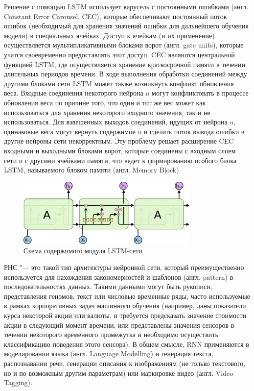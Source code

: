 \documentclass[bachelor, och, coursework]{SCWorks}
\begin{document}
        Решение с помощью LSTM использует карусель с постоянными ошибками (англ. Constant Error Carousel, CEC), которые
        обеспечивают постоянный поток ошибок (необходимый для хранения значений ошибки для дальнейшего обучения модели)
        в специальных ячейках. Доступ к ячейкам (и их применение) осуществляется мультипликативными блоками ворот (англ.
        gate units), которые учатся своевременно предоставлять этот доступ. CEC являются центральной функцией LSTM, где
        осуществляется хранение краткосрочной памяти в течении длительных периодов времени. В ходе выполнения обработки
        соединений между другими блоками сети LSTM может также возникнуть конфликт обновления веса. Входные соединения
        некоторого нейрона $u$ могут конфликтовать в процессе обновления веса по причине того, что один и тот же вес
        может как использоваться для хранения некоторого входного значения, так и не использоваться. Для взвешенных
        выходов соединений, идущих от нейрона $u$, одинаковые веса могут вернуть содержимое $u$ и сделать поток вывода
        ошибки в другие нейроны сети некорректным. Эту проблему решает расширение CEC входными и выходными блоками
        ворот, которые соединены с входным слоем сети и с другими ячейками памяти, что ведет к формированию особого
        блока LSTM, называемого блоком памяти (англ. Memory Block).

        \begin{figure}[H]
            \centering
            \includegraphics[width=0.8\textwidth]{pics/lstm.png}
            \caption{Схема содержимого модуля LSTM-сети}
        \end{figure}

        РНС "--- это такой тип архитектуры нейронной сети, который преимущественно используется для нахождения
        закономерностей и шаблонов (англ. pattern) в последовательностях данных. Такими данными могут быть рукописи,
        представления геномов, текст или числовые временные ряды, часто используемые в рамках корпоративных задач
        машинного обучения (например, даны показатели курса некоторой акции или валюты, и требуется предсказать значение
        стоимости акции в следующий момент времени, или представлены значения сенсоров в течении некоторого временного
        промежутка и необходимо осуществить классификацию поведения этого сенсора). В общем смысле, RNN применяются в
        моделировании языка (англ. Language Modelling) и генерация текста, распознавании речи, генерации описания к
        изображениям (не только текстового, но и по возможным другим параметрам) или маркировке видео (англ. Video
        Tagging).
        
\end{document}
